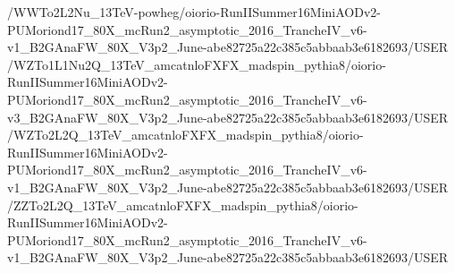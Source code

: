 /WWTo2L2Nu_13TeV-powheg/oiorio-RunIISummer16MiniAODv2-PUMoriond17_80X_mcRun2_asymptotic_2016_TrancheIV_v6-v1_B2GAnaFW_80X_V3p2_June-abe82725a22c385c5abbaab3e6182693/USER
/WZTo1L1Nu2Q_13TeV_amcatnloFXFX_madspin_pythia8/oiorio-RunIISummer16MiniAODv2-PUMoriond17_80X_mcRun2_asymptotic_2016_TrancheIV_v6-v3_B2GAnaFW_80X_V3p2_June-abe82725a22c385c5abbaab3e6182693/USER
/WZTo2L2Q_13TeV_amcatnloFXFX_madspin_pythia8/oiorio-RunIISummer16MiniAODv2-PUMoriond17_80X_mcRun2_asymptotic_2016_TrancheIV_v6-v1_B2GAnaFW_80X_V3p2_June-abe82725a22c385c5abbaab3e6182693/USER
/ZZTo2L2Q_13TeV_amcatnloFXFX_madspin_pythia8/oiorio-RunIISummer16MiniAODv2-PUMoriond17_80X_mcRun2_asymptotic_2016_TrancheIV_v6-v1_B2GAnaFW_80X_V3p2_June-abe82725a22c385c5abbaab3e6182693/USER
